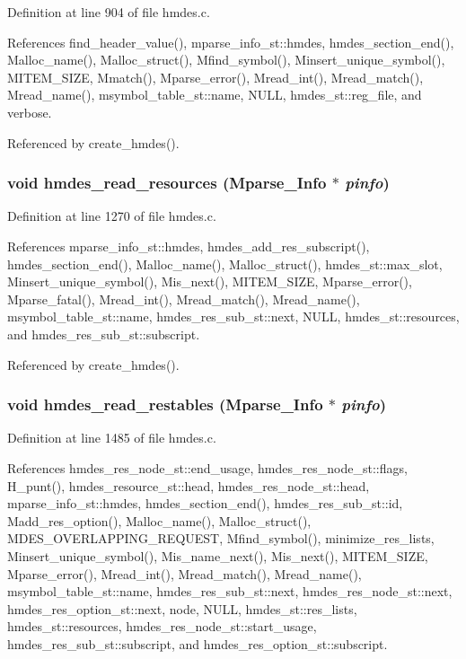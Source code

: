 Definition at line 904 of file hmdes.c.

References find\_\-header\_\-value(), mparse\_\-info\_\-st::hmdes, hmdes\_\-section\_\-end(), Malloc\_\-name(), Malloc\_\-struct(), Mfind\_\-symbol(), Minsert\_\-unique\_\-symbol(), MITEM\_\-SIZE, Mmatch(), Mparse\_\-error(), Mread\_\-int(), Mread\_\-match(), Mread\_\-name(), msymbol\_\-table\_\-st::name, NULL, hmdes\_\-st::reg\_\-file, and verbose.

Referenced by create\_\-hmdes().
\subsubsection{\setlength{\rightskip}{0pt plus 5cm}void hmdes\_\-read\_\-resources (\bf{Mparse\_\-Info} $\ast$ {\em pinfo})}\label{hmdes_8c_cd1ff0019bf0cc483c1ec95416c53450}




Definition at line 1270 of file hmdes.c.

References mparse\_\-info\_\-st::hmdes, hmdes\_\-add\_\-res\_\-subscript(), hmdes\_\-section\_\-end(), Malloc\_\-name(), Malloc\_\-struct(), hmdes\_\-st::max\_\-slot, Minsert\_\-unique\_\-symbol(), Mis\_\-next(), MITEM\_\-SIZE, Mparse\_\-error(), Mparse\_\-fatal(), Mread\_\-int(), Mread\_\-match(), Mread\_\-name(), msymbol\_\-table\_\-st::name, hmdes\_\-res\_\-sub\_\-st::next, NULL, hmdes\_\-st::resources, and hmdes\_\-res\_\-sub\_\-st::subscript.

Referenced by create\_\-hmdes().
\subsubsection{\setlength{\rightskip}{0pt plus 5cm}void hmdes\_\-read\_\-restables (\bf{Mparse\_\-Info} $\ast$ {\em pinfo})}\label{hmdes_8c_ac8add27a07c2d96cf0f917674ef99e9}




Definition at line 1485 of file hmdes.c.

References hmdes\_\-res\_\-node\_\-st::end\_\-usage, hmdes\_\-res\_\-node\_\-st::flags, H\_\-punt(), hmdes\_\-resource\_\-st::head, hmdes\_\-res\_\-node\_\-st::head, mparse\_\-info\_\-st::hmdes, hmdes\_\-section\_\-end(), hmdes\_\-res\_\-sub\_\-st::id, Madd\_\-res\_\-option(), Malloc\_\-name(), Malloc\_\-struct(), MDES\_\-OVERLAPPING\_\-REQUEST, Mfind\_\-symbol(), minimize\_\-res\_\-lists, Minsert\_\-unique\_\-symbol(), Mis\_\-name\_\-next(), Mis\_\-next(), MITEM\_\-SIZE, Mparse\_\-error(), Mread\_\-int(), Mread\_\-match(), Mread\_\-name(), msymbol\_\-table\_\-st::name, hmdes\_\-res\_\-sub\_\-st::next, hmdes\_\-res\_\-node\_\-st::next, hmdes\_\-res\_\-option\_\-st::next, node, NULL, hmdes\_\-st::res\_\-lists, hmdes\_\-st::resources, hmdes\_\-res\_\-node\_\-st::start\_\-usage, hmdes\_\-res\_\-sub\_\-st::subscript, and hmdes\_\-res\_\-option\_\-st::subscript.

